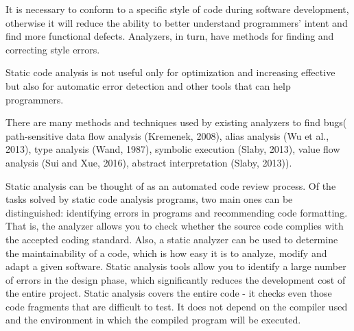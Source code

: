 It is necessary to conform to a specific style of code during software development, otherwise it will reduce the ability to better understand programmers’ intent and ﬁnd more functional defects. Analyzers, in turn, have methods for finding and correcting style errors. 

Static code analysis is not useful only for optimization and increasing effective but also for automatic error detection and other tools that can help programmers.

There are many methods and techniques used by existing analyzers to ﬁnd bugs( path-sensitive data ﬂow analysis (Kremenek, 2008), alias analysis (Wu et al., 2013), type analysis (Wand, 1987), symbolic execution (Slaby, 2013), value ﬂow analysis (Sui and Xue, 2016), abstract interpretation (Slaby, 2013)).

Static analysis can be thought of as an automated code review process. Of the tasks solved by static code analysis programs, two main ones can be distinguished: identifying errors in programs and recommending code formatting. That is, the analyzer allows you to check whether the source code complies with the accepted coding standard. Also, a static analyzer can be used to determine the maintainability of a code, which is how easy it is to analyze, modify and adapt a given software. Static analysis tools allow you to identify a large number of errors in the design phase, which significantly reduces the development cost of the entire project. Static analysis covers the entire code - it checks even those code fragments that are difficult to test. It does not depend on the compiler used and the environment in which the compiled program will be executed.